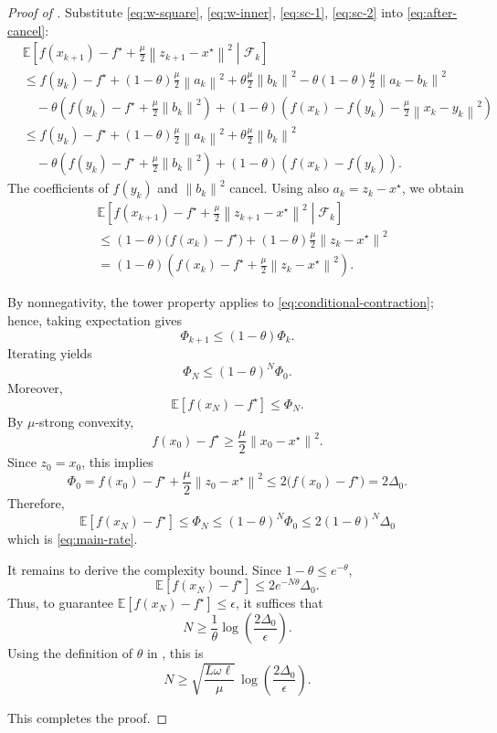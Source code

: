 \documentclass[10pt]{article}
\newcommand{\E}{\mathbb{E}}
\newcommand{\F}{\mathcal{F}}
\newcommand{\norm}[1]{\left\|#1\right\|}
\begin{document}
\begin{proof}[Proof of ]
Substitute \eqref{eq:w-square}, \eqref{eq:w-inner}, \eqref{eq:sc-1}, \eqref{eq:sc-2}
into \eqref{eq:after-cancel}:
\begin{align}
&\E\!\left[f(x_{k+1})-f^\star+\frac{\mu}{2}\norm{z_{k+1}-x^\star}^2 \middle|\F_k\right] \nonumber\\
&\le f(y_k)-f^\star
+(1-\theta)\frac{\mu}{2}\norm{a_k}^2
+\theta\frac{\mu}{2}\norm{b_k}^2
-\theta(1-\theta)\frac{\mu}{2}\norm{a_k-b_k}^2 \nonumber\\
&\quad
-\theta\!\left(f(y_k)-f^\star+\frac{\mu}{2}\norm{b_k}^2\right)
+(1-\theta)\!\left(f(x_k)-f(y_k)-\frac{\mu}{2}\norm{x_k-y_k}^2\right)\\
&\le f(y_k)-f^\star
+(1-\theta)\frac{\mu}{2}\norm{a_k}^2
+\theta\frac{\mu}{2}\norm{b_k}^2 \nonumber\\
&\quad
-\theta\!\left(f(y_k)-f^\star+\frac{\mu}{2}\norm{b_k}^2\right)
+(1-\theta)\!\left(f(x_k)-f(y_k)\right).
\end{align}
The coefficients of \(f(y_k)\) and \(\norm{b_k}^2\) cancel.
Using also \(a_k=z_k-x^\star\), we obtain
\begin{align}
&\E\!\left[f(x_{k+1})-f^\star+\frac{\mu}{2}\norm{z_{k+1}-x^\star}^2 \middle|\F_k\right] \nonumber\\
&\le
(1-\theta)\bigl(f(x_k)-f^\star\bigr)
+(1-\theta)\frac{\mu}{2}\norm{z_k-x^\star}^2 \nonumber\\
&= (1-\theta)\left(f(x_k)-f^\star+\frac{\mu}{2}\norm{z_k-x^\star}^2\right).
\label{eq:conditional-contraction}
\end{align}

By nonnegativity, the tower property applies to
\eqref{eq:conditional-contraction}; hence, taking expectation gives
\begin{equation}
\Phi_{k+1}\le (1-\theta)\Phi_k.
\label{eq:phi-contraction}
\end{equation}
Iterating yields
\[
\Phi_N\le (1-\theta)^N\Phi_0.
\]
Moreover,
\[
\E[f(x_N)-f^\star]\le \Phi_N.
\]
By \(\mu\)-strong convexity,
\[
f(x_0)-f^\star
\ge
\frac{\mu}{2}\norm{x_0-x^\star}^2.
\]
Since \(z_0=x_0\), this implies
\[
\Phi_0
=
f(x_0)-f^\star+\frac{\mu}{2}\norm{z_0-x^\star}^2
\le
2\bigl(f(x_0)-f^\star\bigr)
=
2\Delta_0.
\]
Therefore,
\[
\E[f(x_N)-f^\star]
\le \Phi_N
\le (1-\theta)^N\Phi_0
\le 2(1-\theta)^N\Delta_0
\]
which is \eqref{eq:main-rate}.

It remains to derive the complexity bound. Since \(1-\theta\le e^{-\theta}\),
\[
\E[f(x_N)-f^\star]
\le
2e^{-N\theta}\Delta_0.
\]
Thus, to guarantee \(\E[f(x_N)-f^\star]\le\epsilon\), it suffices that
\[
N
\ge
\frac{1}{\theta}\log\!\left(\frac{2\Delta_0}{\epsilon}\right).
\]
Using the definition of \(\theta\) in , this is
\[
N
\ge
\sqrt{\frac{L\omega\ell}{\mu}}\,
\log\!\left(\frac{2\Delta_0}{\epsilon}\right).
\]

This completes the proof.
\end{proof}
\end{document}

